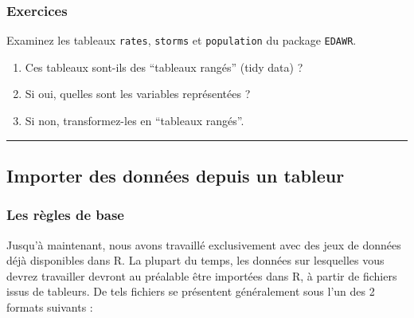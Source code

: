 \documentclass[a4paperpaper,]{article}
\providecommand{\tightlist}{%
  \setlength{\itemsep}{0pt}\setlength{\parskip}{0pt}}
\theoremstyle{definition}
\theoremstyle{definition}
\theoremstyle{definition}
\theoremstyle{remark}
\begin{document}
\hypertarget{exercices-7}{%
\subsubsection{Exercices}\label{exercices-7}}

Examinez les tableaux \texttt{rates}, \texttt{storms} et
\texttt{population} du package \texttt{EDAWR}.

\begin{enumerate}
\def\labelenumi{\arabic{enumi}.}
\tightlist
\item
  Ces tableaux sont-ils des ``tableaux rangés'' (tidy data) ?
\item
  Si oui, quelles sont les variables représentées ?
\item
  Si non, transformez-les en ``tableaux rangés''.
\end{enumerate}

\begin{center}\rule{0.5\linewidth}{\linethickness}\end{center}

\hypertarget{importer-des-donnees-depuis-un-tableur}{%
\subsection{Importer des données depuis un
tableur}\label{importer-des-donnees-depuis-un-tableur}}

\hypertarget{les-regles-de-base}{%
\subsubsection{Les règles de base}\label{les-regles-de-base}}

Jusqu'à maintenant, nous avons travaillé exclusivement avec des jeux de
données déjà disponibles dans R. La plupart du temps, les données sur
lesquelles vous devrez travailler devront au préalable être importées
dans R, à partir de fichiers issus de tableurs. De tels fichiers se
présentent généralement sous l'un des 2 formats suivants :
\end{document}
